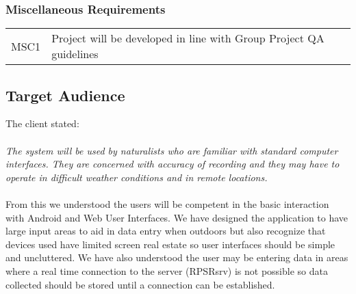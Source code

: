 \subsubsection{Miscellaneous Requirements}
	\begin{tabular}{r | p{15cm}}
		MSC1 & Project will be developed in line with Group Project QA guidelines \\
	\end{tabular}

\subsection{Target Audience}
	The client stated: \\ \\
		\indent \textit{The system will be used by naturalists who are familiar with standard computer interfaces. They are concerned with accuracy of recording and they may have to operate in difficult weather conditions and in remote locations.}\\ \\

	From this we understood the users will be competent in the basic interaction with Android and Web User Interfaces. We have designed the application to have large input areas to aid in data entry when outdoors but also recognize that devices used have limited screen real estate so user interfaces should be simple and uncluttered. We have also understood the user may be entering data in areas where a real time connection to the server (RPSRsrv) is not possible so data collected should be stored until a connection can be established.